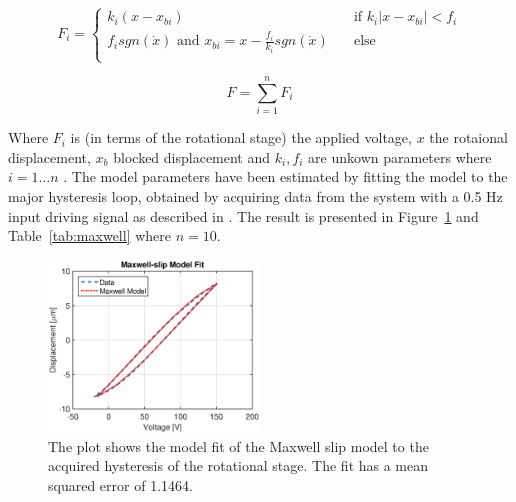 \begin{equation}
  \label{eq:maxwell_slip}
  F_i =
  \begin{cases}
    k_i(x - x_{bi}) & \quad \text{if }  k_i|x - x_{bi}| < f_i\\
    f_isgn(\dot{x}) \text{ and } x_{bi} = x - \frac{f_i}{k_i}sgn(\dot{x})  & \quad \text{else}\\
  \end{cases}
\end{equation}

\begin{equation}
  \label{eq:maxwell_sum}
  F = \displaystyle\sum_{i=1}^{n} F_i
\end{equation}

Where $F_i$ is (in terms of the rotational stage) the applied voltage, $x$ the rotaional displacement, $x_b$ blocked displacement and $k_i, f_i$ are unkown parameters where $i=1 \hdots n$ . The model parameters have been estimated by fitting the model to the major hysteresis loop, obtained by acquiring data from the system with a 0.5 Hz input driving signal as described in \cite{ButcherIdentification:2015,ButcherController:2015}. The result is presented in Figure~\ref{fig:maxwell} and Table~\ref{tab:maxwell} where $n=10$.

\begin{figure}[h]
  \centering
  \includegraphics[width=0.5\textwidth]{fig/matlab/maxwell.eps}
  \caption{\label{fig:maxwell} The plot shows the model fit of the Maxwell slip model to the acquired hysteresis of the rotational stage. The fit has a mean squared error of 1.1464.}
\end{figure}

